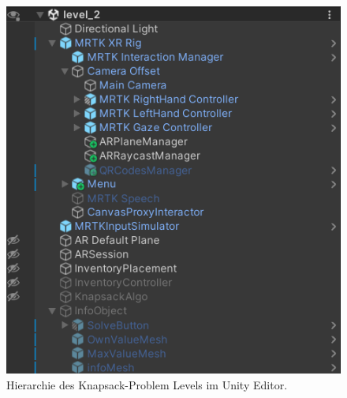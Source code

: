 \begin{figure}[h]
    \centering
    \includegraphics[scale=0.8]{images/Level2Hirarchy}
    \caption{Hierarchie des Knapsack-Problem Levels im Unity Editor.}
    \label{fig:level2_hierarchy}
\end{figure}

